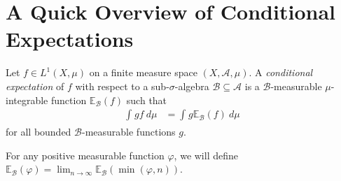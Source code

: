 \documentclass[10pt]{mypackage}
\begin{document}
\RaggedRight
\section{A Quick Overview of Conditional Expectations}%
\begin{definition}
  Let $f\in L^1\left( X,\mu \right)$ on a finite measure space $\left( X,\mathcal{A},\mu \right)$. A \textit{conditional expectation} of $f$ with respect to a sub-$\sigma$-algebra $\mathcal{B}\subseteq \mathcal{A}$ is a $\mathcal{B}$-measurable $\mu$-integrable function $ \mathbb{E}_{\mathcal{B}}\left( f \right) $ such that
  \begin{align*}
    \int_{}^{} gf\:d\mu &= \int_{}^{} g \mathbb{E}_{\mathcal{B}}\left( f \right)\:d\mu\label{eq:conditional_expectation_defining_property}\tag{$\dag$}
  \end{align*}
  for all bounded $\mathcal{B}$-measurable functions $g$.

  For any positive measurable function $\varphi$, we will define $ \mathbb{E}_{\mathcal{B}}\left( \varphi \right) = \lim_{n\to\infty} \mathbb{E}_{\mathcal{B}}\left( \min\left( \varphi,n \right) \right) $.
\end{definition}
\end{document}

